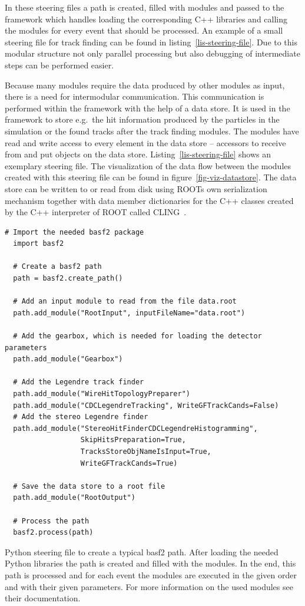 In these steering files a path is created, filled with modules and passed to the framework which handles loading the corresponding C++ libraries and calling the modules for every event that should be processed. An example of a small steering file for track finding can be found in listing~\ref{lis-steering-file}. Due to this modular structure not only parallel processing but also debugging of intermediate steps can be performed easier.

Because many modules require the data produced by other modules as input, there is a need for intermodular communication. This communication is performed within the framework with the help of a data store. It is used in the framework to store e.g.\ the hit information produced by the particles in the simulation or the found tracks after the track finding modules. The modules have read and write access to every element in the data store -- accessors to receive from and put objects on the data store. Listing~\ref{lis-steering-file} shows an exemplary steering file. The visualization of the data flow between the modules created with this steering file can be found in figure~\ref{fig-viz-datastore}. The data store can be written to or read from disk using ROOTs own serialization mechanism together with data member dictionaries for the C++ classes created by the C++ interpreter of ROOT called CLING~\cite{cling}.

\begin{listing}
 \begin{lstlisting}[style=customP]
  # Import the needed basf2 package
  import basf2

  # Create a basf2 path
  path = basf2.create_path()

  # Add an input module to read from the file data.root
  path.add_module("RootInput", inputFileName="data.root")
  
  # Add the gearbox, which is needed for loading the detector parameters
  path.add_module("Gearbox")

  # Add the Legendre track finder
  path.add_module("WireHitTopologyPreparer")
  path.add_module("CDCLegendreTracking", WriteGFTrackCands=False)
  # Add the stereo Legendre finder
  path.add_module("StereoHitFinderCDCLegendreHistogramming",
                  SkipHitsPreparation=True,
                  TracksStoreObjNameIsInput=True,
                  WriteGFTrackCands=True)
  
  # Save the data store to a root file
  path.add_module("RootOutput")

  # Process the path
  basf2.process(path)

 \end{lstlisting}
 \caption[Python steering file to create a typical basf2 path.]{Python steering file to create a typical basf2 path. After loading the needed Python libraries the path is created and filled with the modules. In the end, this path is processed and for each event the modules are executed in the given order and with their given parameters. For more information on the used modules see their documentation.}
 \label{lis-steering-file}
\end{listing}



